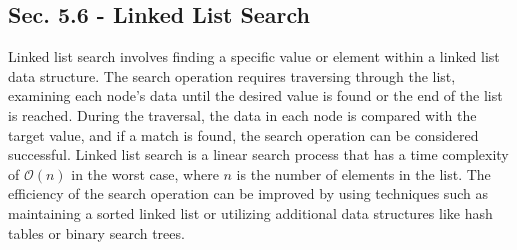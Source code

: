 \subsection*{Sec. 5.6 - Linked List Search}

Linked list search involves finding a specific value or element within a linked list data structure. The search operation requires traversing through the list, examining each node's data until the desired value is found or the end of the list is reached. During the traversal, 
the data in each node is compared with the target value, and if a match is found, the search operation can be considered successful. Linked list search is a linear search process that has a time complexity of $\mathcal{O}(n)$ in the worst case, where $n$ is the number of elements in the list. 
The efficiency of the search operation can be improved by using techniques such as maintaining a sorted linked list or utilizing additional data structures like hash tables or binary search trees.

